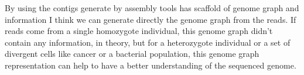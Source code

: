 \documentclass[main.tex]{subfiles}
\begin{document}
By using the contigs generate by assembly tools has scaffold of genome graph and \knot \OLC information I think we can generate directly the genome graph from the reads. If reads come from a single homozygote individual, this genome graph didn't contain any information, in theory, but for a heterozygote individual or a set of divergent cells like cancer or a bacterial population, this genome graph representation can help to have a better understanding of the sequenced genome.

\end{document}
